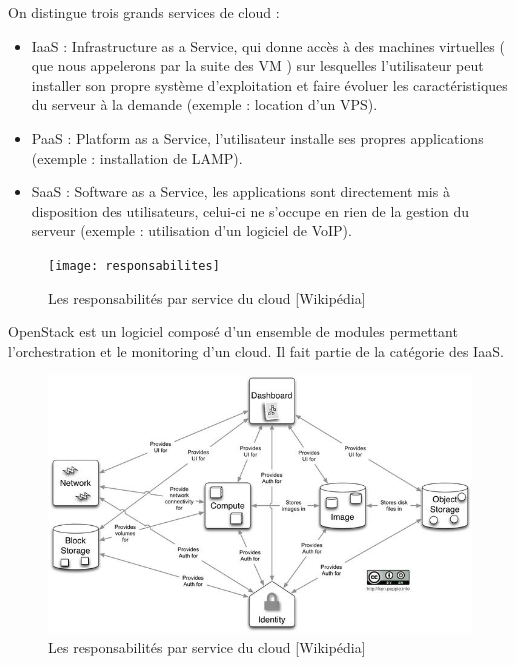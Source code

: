 \documentclass{report}
\begin{document}
    On distingue trois grands services de cloud :
    \begin{itemize}
        \item IaaS : Infrastructure as a Service, qui donne accès à des machines virtuelles ( que nous appelerons par la suite des VM ) sur lesquelles l'utilisateur peut installer son propre système d'exploitation et faire évoluer les caractéristiques du serveur à la demande (exemple : location d'un VPS).
        \item PaaS : Platform as a Service, l'utilisateur installe ses propres applications (exemple : installation de LAMP).
        \item SaaS : Software as a Service, les applications sont directement mis à disposition des utilisateurs, celui-ci ne s'occupe en rien de la gestion du serveur (exemple : utilisation d'un logiciel de VoIP).
    \end{itemize}
    \bigbreak
    \begin{figure}
        \texttt{[image: responsabilites]}
        \caption{Les responsabilités par service du cloud [Wikipédia]}
    \end{figure}   
    
     
    OpenStack est un logiciel composé d'un ensemble de modules permettant l'orchestration et le monitoring d'un cloud. Il fait partie de la catégorie des IaaS.\bigbreak
    
    \begin{figure}
        \includegraphics[width=\textwidth]{openstack_arch}
        \caption{Les responsabilités par service du cloud [Wikipédia]}
    \end{figure}
    
\end{document}
